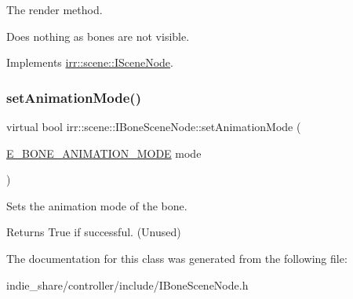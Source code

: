 The render method. 

Does nothing as bones are not visible. 

Implements \hyperlink{classirr_1_1scene_1_1ISceneNode_aff530cc4856792101d0aedee51ce35fa}{irr\+::scene\+::\+I\+Scene\+Node}.

\mbox{\label{classirr_1_1scene_1_1IBoneSceneNode_a424a467f045e809bcad2aa239edb9994}} 
\subsubsection{\texorpdfstring{set\+Animation\+Mode()}{setAnimationMode()}}
{\footnotesize\ttfamily virtual bool irr\+::scene\+::\+I\+Bone\+Scene\+Node\+::set\+Animation\+Mode (\begin{DoxyParamCaption}\item[{\hyperlink{namespaceirr_1_1scene_a318162c0a3aad1cf228ed7daddd44801}{E\+\_\+\+B\+O\+N\+E\+\_\+\+A\+N\+I\+M\+A\+T\+I\+O\+N\+\_\+\+M\+O\+DE}}]{mode }\end{DoxyParamCaption})\hspace{0.3cm}{\ttfamily [pure virtual]}}



Sets the animation mode of the bone. 

\begin{DoxyReturn}{Returns}
True if successful. (Unused) 
\end{DoxyReturn}


The documentation for this class was generated from the following file\+:\begin{DoxyCompactItemize}
\item 
indie\+\_\+share/controller/include/I\+Bone\+Scene\+Node.\+h\end{DoxyCompactItemize}
